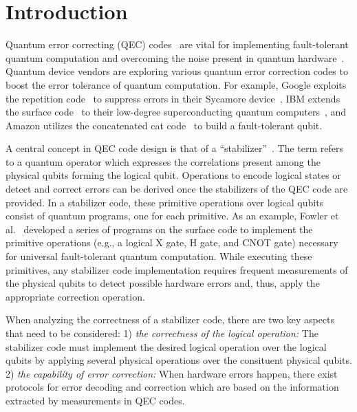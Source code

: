 \section{Introduction}


Quantum error correcting (QEC) codes~\cite{Fowler2012SurfaceCT, Chamberland2020BuildingAF, Chamberland2020TopologicalAS} are vital for implementing fault-tolerant quantum computation and overcoming the noise present in quantum hardware~\cite{Preskill2018QuantumCI, Holmes2020NISQBQ}. Quantum device vendors are exploring various quantum error correction codes to boost the error tolerance of quantum computation. For example, Google exploits the repetition code~\cite{nielsen2002quantum} to suppress errors in their Sycamore device~\cite{google50296}, IBM extends the surface code~\cite{Fowler2012SurfaceCT} to their low-degree superconducting quantum computers~\cite{Chamberland2020}, and Amazon utilizes the concatenated cat code~\cite{Chamberland2020BuildingAF} to build a fault-tolerant qubit.



A central concept in QEC code design is that of a ``stabilizer''~\cite{Gottesman1997StabilizerCA}. The term refers to a quantum operator which expresses the correlations present among the physical qubits forming the logical qubit. Operations to encode logical states or detect and correct errors can be derived once the stabilizers of the QEC code are provided.
In a stabilizer code, these primitive operations over logical qubits consist of quantum programs, one for each primitive.
As an example, Fowler et al.~\cite{Fowler2012SurfaceCT} developed a series of programs on the surface code to implement the primitive operations (e.g., a logical X gate, H gate, and CNOT gate) necessary for universal fault-tolerant quantum computation.
While executing these primitives, any stabilizer code implementation requires frequent measurements of the physical qubits to detect possible hardware errors and, thus, apply the appropriate correction operation.




When analyzing the correctness of a stabilizer code, there are two key aspects that need to be considered:
1) \textit{the correctness of the logical operation:} The stabilizer code must implement the desired logical operation over the logical qubits by applying several physical operations over the consituent physical qubits. %
2) \textit{the capability of error correction:} 
When hardware errors happen, there exist protocols for error decoding and correction which are based on the information extracted by measurements in QEC codes. %



